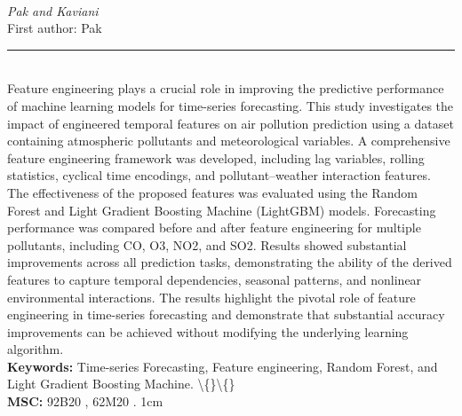 \documentclass[10pt,twoside]{article}
\begin{document}
\noindent\begin{minipage}[t][\textheight]{\textwidth}
\\[0.35em]
{\itshape Pak and Kaviani}\\[0.2em]
{\footnotesize First author: Pak}\\[0.45em]
\noindent\rule{\textwidth}{0.3pt}\\[0.4em]
{\footnotesize  Feature engineering plays a crucial role in improving the predictive performance of machine learning models for time-series forecasting. This study investigates the impact of engineered temporal features on air pollution prediction using a dataset containing atmospheric pollutants and meteorological variables. A comprehensive feature engineering framework was developed, including lag variables, rolling statistics, cyclical time encodings, and pollutant--weather interaction features. The effectiveness of the proposed features was evaluated using the Random Forest and Light Gradient Boosting Machine (LightGBM) models. Forecasting performance was compared before and after feature engineering for multiple pollutants, including CO, O3, NO2, and SO2. Results showed substantial improvements across all prediction tasks, demonstrating the ability of the derived features to capture temporal dependencies, seasonal patterns, and nonlinear environmental interactions. The results highlight the pivotal role of feature engineering in time-series forecasting and demonstrate that substantial accuracy improvements can be achieved without modifying the underlying learning algorithm.}\\[0.4em]
{\footnotesize\bfseries Keywords:} {\footnotesize Time-series Forecasting, Feature engineering, Random Forest, and Light Gradient Boosting Machine. \textbackslash\{\}\textbackslash\{\}}\\[0.15em]
{\footnotesize\bfseries MSC:} {\footnotesize 92B20 , 62M20 . 1cm}\\
\vfill
\end{minipage}
\newpage
\end{document}
